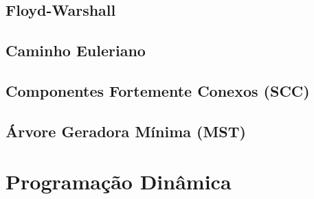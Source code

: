 \subsection{Floyd-Warshall}


\subsection{Caminho Euleriano}


% 

\subsection{Componentes Fortemente Conexos (SCC)}


\subsection{Árvore Geradora Mínima (MST)}


% 

% 

% 

% 

\section{Programação Dinâmica}

